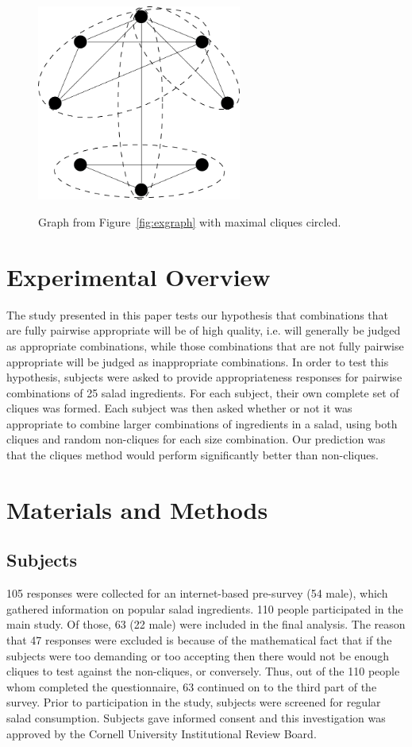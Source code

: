 \begin{figure}[h!]
\caption[Example graph with maximal cliques]{Graph from Figure~\ref{fig:exgraph} with maximal cliques circled.}
\centering
\includegraphics[width=0.6\textwidth]{./img/cliques.png}
\label{fig:exmaxclique}
\end{figure}

\section{Experimental Overview}
The study presented in this paper tests our hypothesis that combinations that are fully pairwise appropriate will be of high quality, i.e. will generally be judged as appropriate combinations, while those combinations that are not fully pairwise appropriate will be judged as inappropriate combinations.  In order to test this hypothesis, subjects were asked to provide appropriateness responses for pairwise combinations of 25 salad ingredients.  For each subject, their own complete set of cliques was formed.  Each subject was then asked whether or not it was appropriate to combine larger combinations of ingredients in a salad, using both cliques and random non-cliques for each size combination.  Our prediction was that the cliques method would perform significantly better than non-cliques.  

\section{Materials and Methods}
\subsection{Subjects}
105 responses were collected for an internet-based pre-survey (54 male), which gathered information on popular salad ingredients.  110 people participated in the main study.  Of those, 63 (22 male) were included in the final analysis.  The reason that 47 responses were excluded is because of the mathematical fact that if the subjects were too demanding or too accepting then there would not be enough cliques to test against the non-cliques, or conversely.  Thus, out of the 110 people whom completed the questionnaire, 63 continued on to the third part of the survey.  Prior to participation in the study, subjects were screened for regular salad consumption.  Subjects gave informed consent and this investigation was approved by the Cornell University Institutional Review Board.

